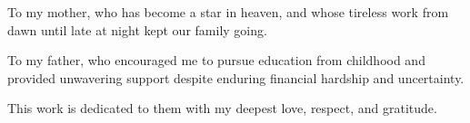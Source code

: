{}
\thispagestyle{plain}

\vspace*{\fill}
\begin{center}
\begin{minipage}{0.78\textwidth}
\centering
To my mother, who has become a star in heaven, and whose tireless work from dawn until late at night kept our family going.

\vspace{1.5\baselineskip}

To my father, who encouraged me to pursue education from childhood and provided unwavering support despite enduring financial hardship and uncertainty.

\vspace{1.5\baselineskip}

This work is dedicated to them with my deepest love, respect, and gratitude.
\end{minipage}
\end{center}
\vspace*{\fill}
